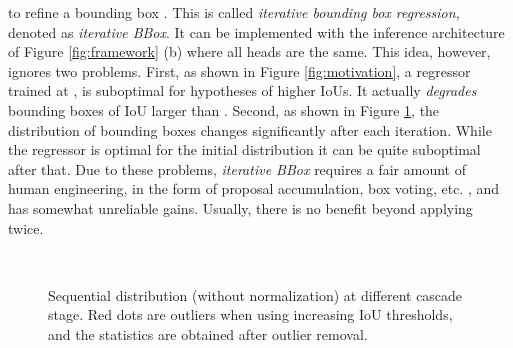 \documentclass[10pt,twocolumn,letterpaper]{article}
\begin{document}
to refine a bounding box . This is called \textit{iterative bounding
box regression}, denoted as \textit{iterative BBox}. It can be implemented
with the inference architecture of Figure \ref{fig:framework} (b) where all
heads are the same. This idea, however, ignores two problems. First, as
shown in Figure \ref{fig:motivation}, a regressor  trained at , is
suboptimal for hypotheses of higher IoUs. It actually {\it degrades\/}
bounding boxes of IoU larger than . Second, as shown in
Figure \ref{fig:distribution}, the distribution of bounding boxes changes
significantly after each iteration. While the regressor is optimal for the
initial distribution it can be quite suboptimal after that. Due to these
problems, \textit{iterative BBox} requires a fair amount of human
engineering, in the form of proposal accumulation, box voting, etc. \cite{DBLP:conf/iccv/GidarisK15,DBLP:conf/bmvc/GidarisK16,DBLP:conf/cvpr/HeZRS16},
and has somewhat unreliable gains. Usually, there is no benefit beyond
applying  twice.


\begin{figure}[!t]
\begin{minipage}[b]{.32\linewidth}
\centering
\centerline{}
\end{minipage}
\hfill
\begin{minipage}[b]{.32\linewidth}
\centering
\centerline{}
\end{minipage}
\hfill
\begin{minipage}[b]{.32\linewidth}
\centering
\centerline{}
\end{minipage}\\
\hfill
\begin{minipage}[b]{.32\linewidth}
\centering
\centerline{}
\end{minipage}
\hfill
\begin{minipage}[b]{.32\linewidth}
\centering
\centerline{}
\end{minipage}
\hfill
\begin{minipage}[b]{.32\linewidth}
\centering
\centerline{}
\end{minipage}
\caption{Sequential  distribution (without normalization) at different cascade stage. Red dots are outliers when using increasing IoU thresholds, and the statistics are obtained after outlier removal.}
\label{fig:distribution}
\end{figure}
\end{document}
